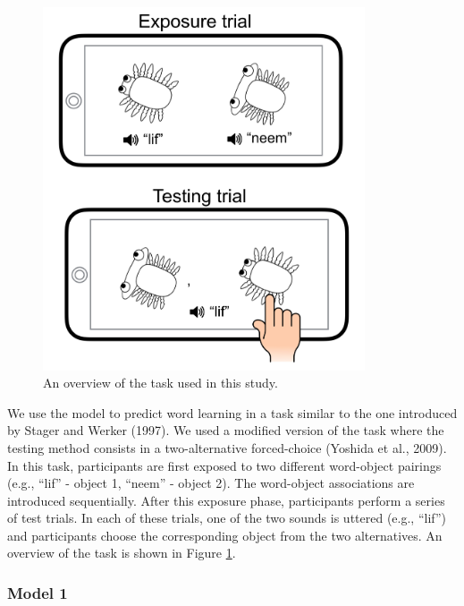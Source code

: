 \documentclass[english,,man,floatsintext]{apa6}
\theoremstyle{definition}
\theoremstyle{definition}
\theoremstyle{definition}
\theoremstyle{remark}
\begin{document}
\begin{figure}[t]

{\centering \includegraphics[width=3.75in]{figs/task} 

}

\caption{An overview of the task used in this study.}\label{fig:task}
\end{figure}

We use the model to predict word learning in a task similar to the one
introduced by Stager and Werker (1997). We used a modified version of
the task where the testing method consists in a two-alternative
forced-choice (Yoshida et al., 2009). In this task, participants are
first exposed to two different word-object pairings (e.g., \enquote{lif}
- object 1, \enquote{neem} - object 2). The word-object associations are
introduced sequentially. After this exposure phase, participants perform
a series of test trials. In each of these trials, one of the two sounds
is uttered (e.g., \enquote{lif}) and participants choose the
corresponding object from the two alternatives. An overview of the task
is shown in Figure \ref{fig:task}.

\subsubsection{Model 1}\label{model-1}
\end{document}
